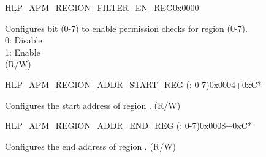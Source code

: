 \begin{register}{H}{LP\_APM\_REGION\_FILTER\_EN\_REG}{0x0000}\label{regdesc:LPAPMREGIONFILTERENREG}
%
%
\regnewline%
\begin{regdesc}\begin{reglist}
\label{fielddesc:LPAPMREGIONFILTEREN}\item [LP\_APM\_REGION\_FILTER\_EN] Configures bit  (0-7) to enable permission checks for region  (0-7).\\
0: Disable \\
1: Enable  \\ (R/W)
\end{reglist}\end{regdesc}
\end{register}


\begin{register}{H}{LP\_APM\_REGION\_ADDR\_START\_REG (: 0-7)}{0x0004+0xC*}\label{regdesc:LPAPMREGIONNADDRSTARTREG}
%
\regnewline%
\begin{regdesc}\begin{reglist}
\label{fielddesc:LPAPMREGIONNADDRSTART}\item [LP\_APM\_REGION\regindex{n}\_ADDR\_START] Configures the start address of region . (R/W)
\end{reglist}\end{regdesc}
\end{register}


\begin{register}{H}{LP\_APM\_REGION\_ADDR\_END\_REG (: 0-7)}{0x0008+0xC*}\label{regdesc:LPAPMREGIONNADDRENDREG}
%
\regnewline%
\begin{regdesc}\begin{reglist}
\label{fielddesc:LPAPMREGIONNADDREND}\item [LP\_APM\_REGION\regindex{n}\_ADDR\_END] Configures the end address of region . (R/W)
\end{reglist}\end{regdesc}
\end{register}


